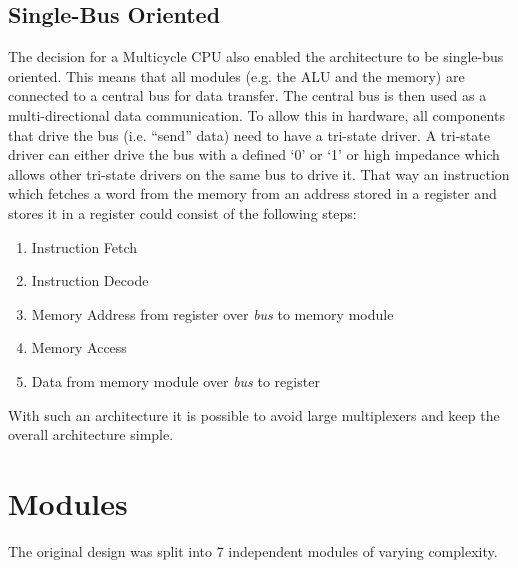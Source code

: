 \subsection{Single-Bus Oriented}
The decision for a Multicycle \gls{CPU} also enabled the architecture to be single-bus oriented.
This means that all modules (e.g. the \gls{ALU} and the memory) are connected to a central bus for data transfer.
The central bus is then used as a multi-directional data communication.
To allow this in hardware, all components that drive the bus (i.e. ``send'' data) need to have a tri-state driver.
A tri-state driver can either drive the bus with a defined `0' or `1' or high impedance which allows other tri-state drivers on the same bus to drive it.
That way an instruction which fetches a word from the memory from an address stored in a register and stores it in a register could consist of the following steps:
\begin{enumerate}
  \item Instruction Fetch
  \item Instruction Decode
  \item Memory Address from register over \emph{bus} to memory module
  \item Memory Access
  \item Data from memory module over \emph{bus} to register
\end{enumerate}
With such an architecture it is possible to avoid large multiplexers and keep the overall architecture simple.


\section{Modules}
The original design was split into 7 independent modules of varying complexity.
